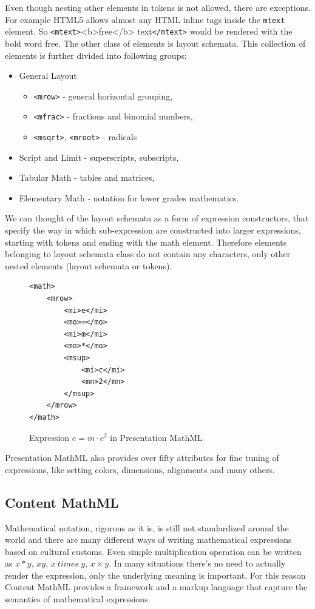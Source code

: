 \documentclass[11pt,oneside,final]{fithesis2}
\begin{document}
Even though nesting other elements in tokens is not allowed, there are exceptions. For example HTML5 allows almost any HTML inline tags inside the \texttt{mtext} element. So \texttt{<mtext>}<b>free</b> text\texttt{</mtext>} would be rendered with the bold word free.
The other class of elements is layout schemata. This collection of elements is further divided into following groups:
\begin{itemize}
\item General Layout
	\begin{itemize}
	\item \texttt{<mrow>} - general horizontal grouping,
	\item \texttt{<mfrac>} - fractions and binomial numbers,
	\item \texttt{<msqrt>}, \texttt{<mroot>} - radicals
	\end{itemize}
\item Script and Limit - superscripts, subscripts, 
\item Tabular Math - tables and matrices,
\item Elementary Math - notation for lower grades mathematics.
\end{itemize}
We can thought of the layout schemata as a form of expression constructors, that specify the way in which sub-expression are constructed into larger expressions, starting with tokens and ending with the math element. Therefore elements belonging to layout schemata class do not contain any characters, only other nested elements (layout schemata or tokens). 

\begin{figure}[!ht]
\lstset{language=XML,frame=lines}
\begin{lstlisting}
<math>
	<mrow>
		<mi>e</mi>
		<mo>=</mo>
		<mi>m</mi>
		<mo>*</mo>
		<msup>
			<mi>c</mi>
			<mn>2</mn>
		</msup>
	</mrow>
</math>
\end{lstlisting}
\caption{Expression $e=m \cdot c^2$ in Presentation MathML}
\label{fig:presentationmathml}
\end{figure}

Presentation MathML also provides over fifty attributes for fine tuning of expressions, like setting colors, dimensions, alignments and many others.

\subsection{Content MathML}
Mathematical notation, rigorous as it is, is still not standardized around the world and there are many different ways of writing mathematical expressions based on cultural customs. Even simple multiplication operation can be written as $x*y$, $xy$, $x\ times\ y$, $x \times y$. In many situations there's no need to actually render the expression, only the underlying meaning is important. For this reason Content MathML provides a framework and a markup language that capture the semantics of mathematical expressions.
\end{document}
